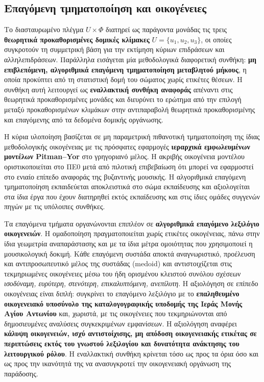 \documentclass[11pt,a4paper]{article}
\begin{document}
\subsection{Επαγόμενη τμηματοποίηση και οικογένειες}\label{app:repr-induced}

Το διασταυρωμένο πλέγμα \(U\times\Phi\) διατηρεί ως παράγοντα μονάδας τις τρεις \textbf{θεωρητικά προκαθορισμένες δομικές κλίμακες} \(U=\{u_1,u_2,u_3\}\), οι οποίες συγκροτούν τη συμμετρική βάση για την εκτίμηση κύριων επιδράσεων και αλληλεπιδράσεων. Παράλληλα εισάγεται μία μεθοδολογικά διαφορετική συνθήκη: \textbf{μη επιβλεπόμενη, αλγοριθμικά επαγόμενη τμηματοποίηση μεταβλητού μήκους}, η οποία προκύπτει από τη στατιστική δομή του σώματος χωρίς ετικέτες θέσεων. Η συνθήκη αυτή λειτουργεί ως \textbf{εναλλακτική συνθήκη αναφοράς} απέναντι στις θεωρητικά προκαθορισμένες μονάδες και διευρύνει το ερώτημα από την επιλογή μεταξύ προκαθορισμένων κλιμάκων στην αντιπαραβολή θεωρητικά προκαθορισμένης και επαγόμενης από τα δεδομένα δομικής οργάνωσης.

Η κύρια υλοποίηση βασίζεται σε μη παραμετρική πιθανοτική τμηματοποίηση της ίδιας μεθοδολογικής οικογένειας με τις πρόσφατες εφαρμογές \textbf{ιεραρχικά εμφωλευμένων μοντέλων Pitman--Yor} στο γρηγοριανό μέλος. Η ακριβής οικογένεια μοντέλου οριστικοποιείται στο ΠΕ0 μετά από πιλοτική επιβεβαίωση ότι μπορεί να εφαρμοστεί στο ενιαίο επίπεδο αναφοράς της βυζαντινής μουσικής. Η αλγοριθμικά επαγόμενη τμηματοποίηση εκπαιδεύεται αποκλειστικά στο σώμα εκπαίδευσης και αξιολογείται στα ίδια έργα που έχουν διατηρηθεί εκτός εκπαίδευσης και στις ίδιες ομάδες συγγενών πηγών με τις υπόλοιπες συνθήκες.

Τα επαγόμενα τμήματα οργανώνονται επιπλέον σε \textbf{αλγοριθμικά επαγόμενο λεξιλόγιο οικογενειών}. Η ομαδοποίηση πραγματοποιείται χωρίς ετικέτες οικογένειας, πάνω στην ίδια γεωμετρία αναπαράστασης και με τα ίδια μέτρα ομοιότητας που χρησιμοποιεί η μουσικολογική δοκιμή. Κάθε επαγόμενη συστάδα αποκτά αναγνωριστικό, προέλευση και αντιπροσωπευτικό μέλος της συστάδας (medoid) και αντιστοιχίζεται στις τεκμηριωμένες οικογένειες μέσω του ήδη ορισμένου κλειστού συνόλου σχέσεων \emph{ισοδύναμη, ευρύτερη, στενότερη, επικαλυπτόμενη, ανεπίλυτη}. Η αξιολόγηση σε επίπεδο οικογένειας είναι διπλή: συγκρίνει το επαγόμενο λεξιλόγιο με το \textbf{επαληθευμένο οικογενειακό υποσύνολο της καταλογογραφικής υποδομής της Ιεράς Μονής Αγίου Αντωνίου} και, χωριστά, με τις οικογένειες που τεκμηριώνονται από δημοσιευμένες αναλύσεις συγκεκριμένων εμφανίσεων. Η αξιολόγηση αναφέρει \textbf{κάλυψη οικογενειών, ισχύ αντιστοίχισης, μη απόδοση οικογενειακής ετικέτας σε περιπτώσεις εκτός του γνωστού λεξιλογίου και δυνατότητα ανάκτησης του λειτουργικού ρόλου}. Η εναλλακτική συνθήκη κρίνεται τόσο ως προς τα όρια όσο και ως προς την ικανότητά της να ανασυγκροτεί την οικογενειακή οργάνωση της παράδοσης.
\end{document}
